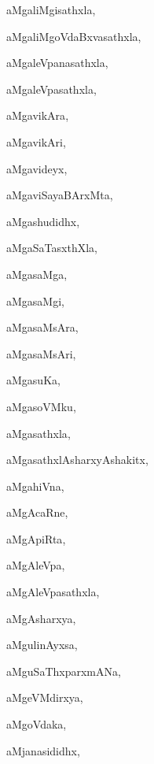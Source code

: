 \begin{multicols}{3}
{\noindent
{aMgaliMgisathxla}, \pageref{aMgaliMgisathxla}

\noindent
{aMgaliMgoVdaBxvasathxla}, \pageref{aMgaliMgoVdaBxvasathxla}

\noindent
{aMgaleVpanasathxla}, \pageref{aMgaleVpanasathxla}

\noindent
{aMgaleVpasathxla}, \pageref{aMgaleVpasathxla}

\noindent
{aMgavikAra}, \pageref{aMgavikAra}

\noindent
{aMgavikAri}, \pageref{aMgavikAri}

\noindent
{aMgavideyx}, \pageref{aMgavideyx}

\noindent
{aMgaviSayaBArxMta}, \pageref{aMgaviSayaBArxMta}

\noindent
{aMgashudidhx}, \pageref{aMgashudidhx}

\noindent
{aMgaSaTasxthXla}, \pageref{aMgaSaTasxthXla}

\noindent
{aMgasaMga}, \pageref{aMgasaMga}

\noindent
{aMgasaMgi}, \pageref{aMgasaMgi}

\noindent
{aMgasaMsAra}, \pageref{aMgasaMsAra}

\noindent
{aMgasaMsAri}, \pageref{aMgasaMsAri}

\noindent
{aMgasuKa}, \pageref{aMgasuKa}

\noindent
{aMgasoVMku}, \pageref{aMgasoVMku}

\noindent
{aMgasathxla}, \pageref{aMgasathxla}

\noindent
{aMgasathxlAsharxyAshakitx}, \pageref{aMgasathxlAsharxyAshakitx}

\noindent
{aMgahiVna}, \pageref{aMgahiVna}

\noindent
{aMgAcaRne}, \pageref{aMgAcaRne}

\noindent
{aMgApiRta}, \pageref{aMgApiRta}

\noindent
{aMgAleVpa}, \pageref{aMgAleVpa}

\noindent
{aMgAleVpasathxla}, \pageref{aMgAleVpasathxla}

\noindent
{aMgAsharxya}, \pageref{aMgAsharxya}

\noindent
{aMgulinAyxsa}, \pageref{aMgulinAyxsa}

\noindent
{aMguSaThxparxmANa}, \pageref{aMguSaThxparxmANa}

\noindent
{aMgeVMdirxya}, \pageref{aMgeVMdirxya}

\noindent
{aMgoVdaka}, \pageref{aMgoVdaka}

\noindent
{aMjanasididhx}, \pageref{aMjanasididhx}

}
\end{multicols}
